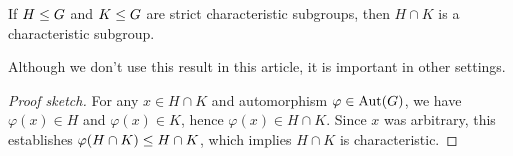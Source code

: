 \begin{theorem}
If $H\leq G$ and $K\leq G$ are strict characteristic subgroups,
then $H\cap K$ is a characteristic subgroup.
\end{theorem}

\begin{thm-remark}
Although we don't use this result in this article, it is important in
other settings.
\end{thm-remark}

\begin{proof}[Proof sketch]
For any $x\in H\cap K$ and automorphism $\varphi\in\operatorname{Aut}(G)$, we have
$\varphi(x)\in H$ and $\varphi(x)\in K$, hence $\varphi(x)\in H\cap K$.
Since $x$ was arbitrary, this establishes $\varphi(H\cap K)\leq H\cap K$,
which implies $H\cap K$ is characteristic.
\end{proof}

